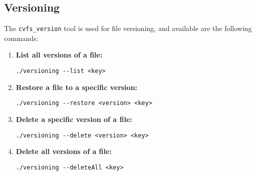 \subsection*{Versioning}

The \texttt{cvfs\_version} tool is used for file versioning, and available are the following commands:

\begin{enumerate}
    \setlength\itemsep{-0.1em}
    \item \textbf{List all versions of a file:} \\
    \begin{BVerbatim}[baseline=t,boxwidth=10cm]
  ./versioning --list <key>
    \end{BVerbatim}

    \item \textbf{Restore a file to a specific version:} \\
    \begin{BVerbatim}[baseline=t,boxwidth=10cm]
  ./versioning --restore <version> <key>
    \end{BVerbatim}

    \item \textbf{Delete a specific version of a file:} \\
    \begin{BVerbatim}[baseline=t,boxwidth=10cm]
  ./versioning --delete <version> <key>
    \end{BVerbatim}

    \item \textbf{Delete all versions of a file:} \\
    \begin{BVerbatim}[baseline=t,boxwidth=10cm]
  ./versioning --deleteAll <key>
    \end{BVerbatim}
\end{enumerate}